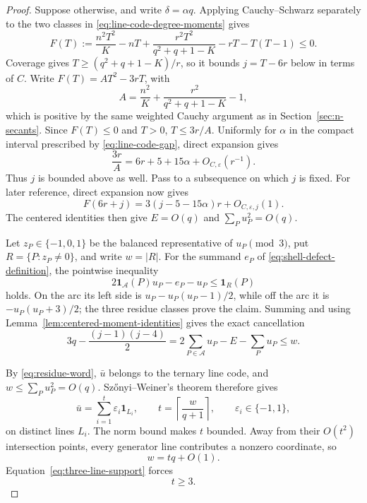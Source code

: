 \begin{proof}
Suppose otherwise, and write \(\delta=\alpha q\).  Applying
Cauchy--Schwarz separately to the two classes in
\eqref{eq:line-code-degree-moments} gives
\begin{equation}\label{eq:line-code-cauchy}
 F(T):=\frac{n^2T^2}{K}-nT
 +\frac{r^2T^2}{q^2+q+1-K}-rT-T(T-1)\le0.
\end{equation}
Coverage gives \(T\ge(q^2+q+1-K)/r\), so it bounds
\(j=T-6r\) below in terms of \(C\).  Write \(F(T)=AT^2-3rT\), with
\[
 A=\frac{n^2}{K}+\frac{r^2}{q^2+q+1-K}-1,
\]
which is positive by the same weighted Cauchy argument as in
Section~\ref{sec:n-secants}.  Since \(F(T)\le0\) and \(T>0\),
\(T\le3r/A\).  Uniformly for \(\alpha\) in the compact interval prescribed
by \eqref{eq:line-code-gap}, direct expansion gives
\[
 \frac{3r}{A}=6r+5+15\alpha+O_{C,\varepsilon}(r^{-1}).
\]
Thus \(j\) is bounded above as well.  Pass to a subsequence on which \(j\)
is fixed.  For later reference, direct expansion now gives
\[
 F(6r+j)=3(j-5-15\alpha)r+O_{C,\varepsilon,j}(1).
\]
The centered identities then give
\(E=O(q)\) and \(\sum_Pu_P^2=O(q)\).

Let \(z_P\in\{-1,0,1\}\) be the balanced representative of \(u_P\pmod3\),
put \(R=\{P:z_P\ne0\}\), and write \(w=|R|\).  For the summand \(e_P\) of
\eqref{eq:shell-defect-definition}, the pointwise inequality
\begin{equation}\label{eq:shell-support-lower}
 2\mathbf1_{\mathcal A}(P)u_P-e_P-u_P
 \le\mathbf1_R(P)
\end{equation}
holds.  On the arc its left side is
\(u_P-u_P(u_P-1)/2\), while off the arc it is
\(-u_P(u_P+3)/2\); the three residue classes prove the claim.  Summing and
using Lemma~\ref{lem:centered-moment-identities} gives the exact cancellation
\begin{equation}\label{eq:three-line-support}
 3q-\frac{(j-1)(j-4)}2
 =2\sum_{P\in\mathcal A}u_P-E-\sum_Pu_P\le w.
\end{equation}

By \eqref{eq:residue-word}, \(\bar u\) belongs to the ternary line code, and
\(w\le\sum_Pu_P^2=O(q)\).  Sz\H{o}nyi--Weiner's theorem therefore gives
\[
 \bar u=\sum_{i=1}^t\varepsilon_i\mathbf1_{L_i},\qquad
 t=\left\lceil\frac{w}{q+1}\right\rceil,\qquad
 \varepsilon_i\in\{-1,1\},
\]
on distinct lines \(L_i\).  The norm bound makes \(t\) bounded.  Away from
their \(O(t^2)\) intersection points, every generator line contributes a
nonzero coordinate, so
\begin{equation}\label{eq:line-code-weight}
 w=tq+O(1).
\end{equation}
Equation~\eqref{eq:three-line-support} forces
\begin{equation}\label{eq:three-lines-needed}
 t\ge3.
\end{equation}


\end{proof}
